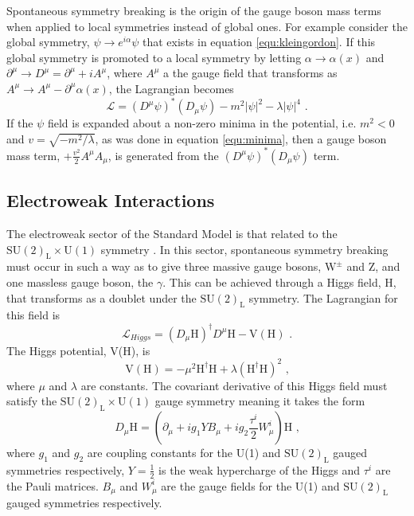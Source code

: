Spontaneous symmetry breaking is the origin of the gauge boson mass terms when applied to local symmetries instead of global ones.  For example consider the global symmetry, $\psi \rightarrow e^{i\alpha} \psi$ that exists in equation \ref{equ:kleingordon}.  If this global symmetry is promoted to a local symmetry by letting $\alpha \rightarrow \alpha(x)$ and $\partial^{\mu} \rightarrow D^{\mu} = \partial^{\mu} + iA^{\mu}$, where $A^{\mu}$ a the gauge field that transforms as $A^{\mu} \rightarrow A^{\mu} - \partial^{\mu}\alpha(x)$, the Lagrangian becomes
%
\begin{equation}
\mathcal{L} = (D^{\mu} \psi)^{*} (D_{\mu} \psi) - m^{2} |\psi|^{2} - \lambda |\psi|^{4} \text{ .}
\end{equation}
%
\noindent If the $\psi$ field is expanded about a non-zero minima in the potential, i.e. $m^{2} < 0$ and $v = \sqrt{-m^{2}/\lambda}$, as was done in equation \ref{equ:minima}, then a gauge boson mass term, $+\frac{v^{2}}{2} A^{\mu} A_{\mu}$, is generated from the $(D^{\mu} \psi)^{*} (D_{\mu} \psi)$ term.


\subsection{Electroweak Interactions}
\label{sec:ewint}
The electroweak sector of the Standard Model is that related to the $\text{SU}(2)_{\text{L}} \times \text{U}(1)$ symmetry \cite{Ellis:2013jnq}.  In this sector, spontaneous symmetry breaking must occur in such a way as to give three massive gauge bosons,  $\text{W}^{\pm}$ and Z, and one massless gauge boson, the $\gamma$.  This can be achieved through a Higgs field, H, that transforms as a doublet under the $\text{SU}(2)_{\text{L}}$ symmetry.  The Lagrangian for this field is
%
\begin{equation}
\mathcal{L}_{Higgs} = (D_{\mu}\text{H})^{\dagger}D^{\mu}\text{H} - \text{V}(\text{H}) \text{ .}
\end{equation}
%
\noindent The Higgs potential, V(H), is
%
\begin{equation}
\text{V}(\text{H}) = -\mu^{2}\text{H}^{\dagger}\text{H} + \lambda (\text{H}^{\dagger}\text{H})^{2} \text{ ,}
\end{equation}
%
\noindent where $\mu$ and $\lambda$ are constants.  The covariant derivative of this Higgs field must satisfy the $\text{SU}(2)_{\text{L}} \times \text{U}(1)$ gauge symmetry meaning it takes the form
%
\begin{equation}
D_{\mu} \text{H} = (\partial_{\mu} + ig_{1}YB_{\mu} + ig_{2}\frac{\tau^{i}}{2}W^{i}_{\mu})\text{H} \text{ ,}
\end{equation}
%
\noindent where $g_{1}$ and $g_{2}$ are coupling constants for the U(1) and $\text{SU}(2)_{\text{L}}$ gauged symmetries respectively, $Y = \frac{1}{2}$ is the weak hypercharge of the Higgs and $\tau^{i}$ are the Pauli matrices.  $B_{\mu}$ and $W^{i}_{\mu}$ are the gauge fields for the U(1) and $\text{SU}(2)_{\text{L}}$ gauged symmetries respectively.  

